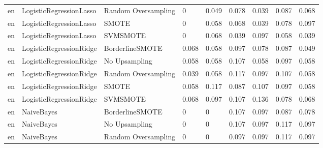 \begin{tabular}{lllllllll}
      en &      LogisticRegressionLasso & Random Oversampling &     0 &                     0.049 &                 0.078 &                  0.039 &                                   0.087 &     0.068 \\
      en &      LogisticRegressionLasso &               SMOTE &     0 &                     0.058 &                 0.068 &                  0.039 &                                   0.078 &     0.097 \\
      en &      LogisticRegressionLasso &            SVMSMOTE &     0 &                     0.068 &                 0.039 &                  0.097 &                                   0.058 &     0.039 \\
      en &      LogisticRegressionRidge &     BorderlineSMOTE & 0.068 &                     0.058 &                 0.097 &                  0.078 &                                   0.087 &     0.049 \\
      en &      LogisticRegressionRidge &       No Upsampling & 0.058 &                     0.058 &                 0.107 &                  0.058 &                                   0.097 &     0.058 \\
      en &      LogisticRegressionRidge & Random Oversampling & 0.039 &                     0.058 &                 0.117 &                  0.097 &                                   0.107 &     0.058 \\
      en &      LogisticRegressionRidge &               SMOTE & 0.058 &                     0.117 &                 0.087 &                  0.107 &                                   0.097 &     0.058 \\
      en &      LogisticRegressionRidge &            SVMSMOTE & 0.068 &                     0.097 &                 0.107 &                  0.136 &                                   0.078 &     0.068 \\
      en &                   NaiveBayes &     BorderlineSMOTE &     0 &                         0 &                 0.107 &                  0.097 &                                   0.087 &     0.078 \\
      en &                   NaiveBayes &       No Upsampling &     0 &                         0 &                 0.107 &                  0.097 &                                   0.117 &     0.097 \\
      en &                   NaiveBayes & Random Oversampling &     0 &                         0 &                 0.097 &                  0.097 &                                   0.117 &     0.097 \\

\end{tabular}
